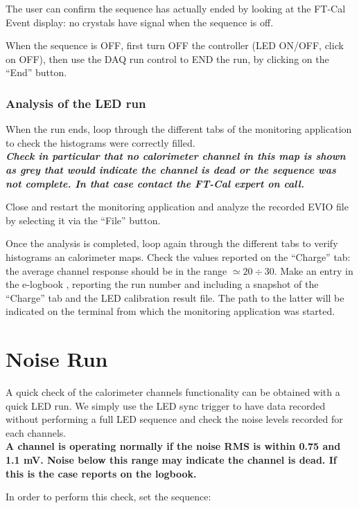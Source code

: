\documentclass[11.5pt]{article}
\begin{document}
The user can confirm the sequence has actually ended by looking at the FT-Cal Event display: no crystals have signal when the sequence is off.

When the sequence is OFF, first turn OFF the controller (LED ON/OFF, click on OFF), 
then use the DAQ run control to END the run, by clicking on the ``End'' button.

\subsubsection{Analysis of the LED run}
When the run ends, loop through the different tabs of the monitoring application to check the histograms were correctly filled. \\
\textit{\textbf{Check in particular that no calorimeter channel in this map is shown as grey that would indicate the channel is dead or the sequence was not complete. In that case  contact the FT-Cal expert on call.}}

Close and restart the monitoring application and analyze the recorded EVIO file by selecting it via the ``File'' button. 

Once the analysis is completed, loop again through the different tabs to verify histograms an calorimeter maps. Check the values reported on the ``Charge'' tab:  the average channel response should be in the range $\simeq 20 \div 30$.  Make an entry in the e-logbook , reporting the run number and including a snapshot of the ``Charge'' tab and the LED calibration result file. The path to the latter will be indicated on the terminal from which the monitoring application was started.

\section{Noise Run}
A quick check of the calorimeter channels functionality can be obtained with a quick LED run. We simply use the LED sync trigger to have data recorded without performing a full LED sequence and check the noise levels recorded for each channels.\\ 
\textbf{A channel is operating normally if the noise RMS is within 0.75 and 1.1 mV. Noise below this range may indicate the channel is dead. If this is the case reports on the logbook.}

In order to perform this check, set the sequence: 
\end{document}
